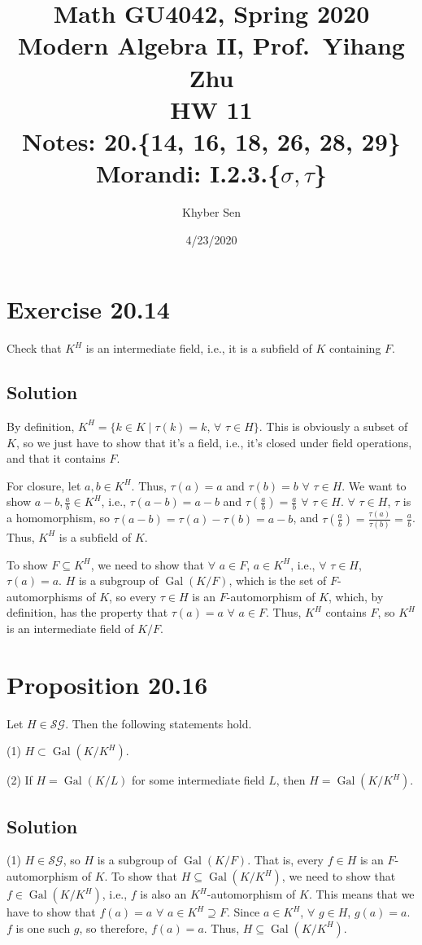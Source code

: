 \documentclass[fleqn]{article}
\title{
Math GU4042, Spring 2020 \\
Modern Algebra II, Prof.\ Yihang Zhu \\
HW 11 \\
Notes: 20.\{14, 16, 18, 26, 28, 29\} \\
Morandi: I.2.3.\{$\sigma, \tau$\} \\
}
\author{Khyber Sen}
\date{4/23/2020}
\DeclareMathOperator{\Gal}{Gal}
\begin{document}
    
    \maketitle
    
    \section{Exercise 20.14}
    Check that $K^H$ is an intermediate field, i.e., it is a subfield of $K$ containing $F$.
        
        \subsection{Solution}
        By definition, $K^H = \{k \in K \mid \tau(k) = k$, $\forall$ $\tau \in H\}$.  This is obviously a subset of $K$, so we just have to show that it's a field, i.e., it's closed under field operations, and that it contains $F$.
        
        For closure, let $a, b \in K^H$.  Thus, $\tau(a) = a$ and $\tau(b) = b$ $\forall$ $\tau \in H$.  We want to show $a - b, \frac{a}{b} \in K^H$, i.e., $\tau(a - b) = a - b$ and $\tau\left(\frac{a}{b}\right) = \frac{a}{b}$ $\forall$ $\tau \in H$.  $\forall$ $\tau \in H$, $\tau$ is a homomorphism, so $\tau(a - b) = \tau(a) - \tau(b) = a - b$, and $\tau\left(\frac{a}{b}\right) = \frac{\tau(a)}{\tau(b)} = \frac{a}{b}$.  Thus, $K^H$ is a subfield of $K$.
        
        To show $F \subseteq K^H$, we need to show that $\forall$ $a \in F$, $a \in K^H$, i.e., $\forall$ $\tau \in H$, $\tau(a) = a$.  $H$ is a subgroup of $\Gal(K/F)$, which is the set of $F$-automorphisms of $K$, so every $\tau \in H$ is an $F$-automorphism of $K$, which, by definition, has the property that $\tau(a) = a$ $\forall$ $a \in F$.  Thus, $K^H$ contains $F$, so $K^H$ is an intermediate field of $K/F$.
    
    \section{Proposition 20.16}
    Let $H \in \mathcal{SG}$.  Then the following statements hold.
    
    (1) $H \subset \Gal\left(K/K^H\right)$.
    
    (2) If $H = \Gal(K/L)$ for some intermediate field $L$, then $H = \Gal\left(K/K^H\right)$.
        
        \subsection{Solution}
        (1) $H \in \mathcal{SG}$, so $H$ is a subgroup of $\Gal(K/F)$.  That is, every $f \in H$ is an $F$-automorphism of $K$.  To show that $H \subseteq \Gal\left(K/K^H\right)$, we need to show that $f \in \Gal\left(K/K^H\right)$, i.e., $f$ is also an $K^H$-automorphism of $K$.  This means that we have to show that $f(a) = a$ $\forall$ $a \in K^H \supseteq F$.  Since $a \in K^H$, $\forall$ $g \in H$, $g(a) = a$.  $f$ is one such $g$, so therefore, $f(a) = a$.  Thus, $H \subseteq \Gal\left(K/K^H\right)$.
        
\end{document}
